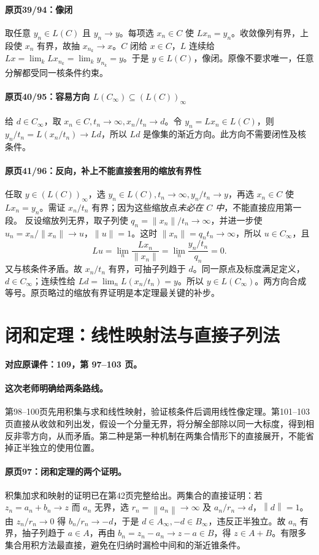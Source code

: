 \documentclass[11pt,a4paper]{article}
\newcommand{\norm}[1]{\left\lVert#1\right\rVert}
\theoremstyle{definition}\newtheorem{definition}{定义}\newtheorem{example}{例}
\begin{document}
\paragraph{原页39/94：像闭}
取任意 $y_n\in L(C)$ 且 $y_n\to y$。每项选 $x_n\in C$ 使 $Lx_n=y_n$。收敛像列有界，上段使 $x_n$ 有界，故抽 $x_{n_k}\to x$。$C$ 闭给 $x\in C$，$L$ 连续给 $Lx=\lim_kLx_{n_k}=\lim_ky_{n_k}=y$。于是 $y\in L(C)$，像闭。原像不要求唯一，任意分解都受同一核条件约束。
\paragraph{原页40/95：容易方向 $L(C_\infty)\subseteq(L(C))_\infty$}
给 $d\in C_\infty$，取 $x_n\in C,t_n\to\infty,x_n/t_n\to d$。令 $y_n=Lx_n\in L(C)$，则 $y_n/t_n=L(x_n/t_n)\to Ld$，所以 $Ld$ 是像集的渐近方向。此方向不需要闭性及核条件。
\paragraph{原页41/96：反向，补上不能直接套用的缩放有界性}
任取 $y\in(L(C))_\infty$，选 $y_n\in L(C),t_n\to\infty,y_n/t_n\to y$，再选 $x_n\in C$ 使 $Lx_n=y_n$。需证 $x_n/t_n$ 有界；因为这些缩放点\emph{未必在 $C$ 中}，不能直接应用第一段。
反设缩放列无界，取子列使 $q_n=\|x_n\|/t_n\to\infty$，并进一步使 $u_n=x_n/\|x_n\|\to u$，$\|u\|=1$。这时 $\|x_n\|=q_nt_n\to\infty$，所以 $u\in C_\infty$，且
\[Lu=\lim_n\frac{Lx_n}{\|x_n\|}=\lim_n\frac{y_n/t_n}{q_n}=0.\]
又与核条件矛盾。故 $x_n/t_n$ 有界，可抽子列趋于 $d$。同一原点及标度满足定义，$d\in C_\infty$；连续性给 $Ld=\lim_nL(x_n/t_n)=y$。所以 $y\in L(C_\infty)$。两方向合成等号。原页略过的缩放有界证明是本定理最关键的补步。


\clearpage\section{闭和定理：线性映射法与直接子列法}\label{g:109:97}

\textbf{对应原课件：109，第 97--103 页。}


\paragraph{这次老师明确给两条路线。}
第98--100页先用积集与求和线性映射，验证核条件后调用线性像定理。第101--103页直接从收敛和列出发，假设一个分量无界，将分解全部除以同一大标度，得到相反非零方向，从而矛盾。第二种是第一种机制在两集合情形下的直接展开，不能省掉正半独立的使用位置。


\paragraph{原页97：闭和定理的两个证明。}积集加求和映射的证明已在第42页完整给出。两集合的直接证明：若 $z_n=a_n+b_n\to z$ 而 $a_n$ 无界，选 $r_n=\norm{a_n}\to\infty$ 及 $a_n/r_n\to d$，$\norm d=1$。由 $z_n/r_n\to0$ 得 $b_n/r_n\to-d$，于是 $d\in A_\infty,-d\in B_\infty$，违反正半独立。故 $a_n$ 有界，抽子列趋于 $a\in A$，再由 $b_n=z_n-a_n\to z-a\in B$，得 $z\in A+B$。有限多集合用积方法最直接，避免在归纳时漏检中间和的渐近锥条件。
\end{document}
